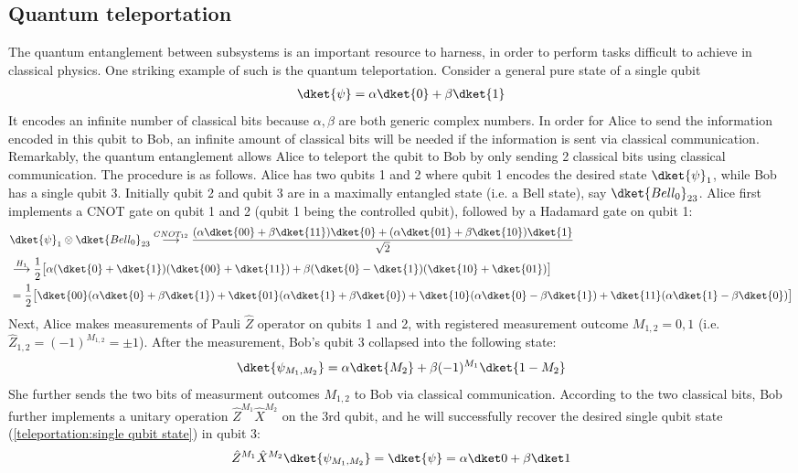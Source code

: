

\subsection{Quantum teleportation}

The quantum entanglement between subsystems is an important resource to harness, in order to perform tasks difficult to achieve in classical physics. One striking example of such is the quantum teleportation. Consider a general pure state of a single qubit
\begin{align}\label{teleportation:single qubit state}
\dket{\psi}=\alpha\dket{0}+\beta\dket{1}
\end{align}
It encodes an infinite number of classical bits because $\alpha,\beta$ are both generic complex numbers. In order for Alice to send the information encoded in this qubit to Bob, an infinite amount of classical bits will be needed if the information is sent via classical communication. Remarkably, the quantum entanglement allows Alice to teleport the qubit to Bob by only sending 2 classical bits using classical communication. The procedure is as follows. Alice has two qubits 1 and 2 where qubit 1 encodes the desired state $\dket{\psi}_1$, while Bob has a single qubit 3. Initially qubit 2 and qubit 3 are in a maximally entangled state (i.e. a Bell state), say $\dket{Bell_0}_{23}$. Alice first implements a CNOT gate on qubit 1 and 2 (qubit 1 being the controlled qubit), followed by a Hadamard gate on qubit 1:
\begin{align}
&\dket{\psi}_1\otimes\dket{Bell_0}_{23}\overset{CNOT_{12}}\longrightarrow\frac{(\alpha\dket{00}+\beta\dket{11})\dket{0}+(\alpha\dket{01}+\beta\dket{10})\dket{1}}{\sqrt2}\\
&\overset{H_1}\longrightarrow\frac12\big[\alpha(\dket{0}+\dket{1})(\dket{00}+\dket{11})+\beta(\dket{0}-\dket{1})(\dket{10}+\dket{01})\big]\\
&=\frac12\big[\dket{00}(\alpha\dket{0}+\beta\dket{1})+\dket{01}(\alpha\dket{1}+\beta\dket{0})+\dket{10}(\alpha\dket{0}-\beta\dket{1})+\dket{11}(\alpha\dket{1}-\beta\dket{0})\big]
\end{align}
Next, Alice makes measurements of Pauli $\hat Z$ operator on qubits 1 and 2, with registered measurement outcome $M_{1,2}=0,1$ (i.e. $\hat Z_{1,2}=(-1)^{M_{1,2}}=\pm1$). After the measurement, Bob's qubit 3 collapsed into the following state:
\begin{align}
\dket{\psi_{M_1,M_2}}=\alpha\dket{M_2}+\beta(-1)^{M_1}\dket{1-M_2}
\end{align}
She further sends the two bits of measurment outcomes $M_{1,2}$ to Bob via classical communication. According to the two classical bits, Bob further implements a unitary operation $\hat Z^{M_1}\hat X^{M_2}$ on the 3rd qubit, and he will successfully recover the desired single qubit state (\ref{teleportation:single qubit state}) in qubit 3:
\begin{align}
\hat Z^{M_1}\hat X^{M_2}\dket{\psi_{M_1,M_2}}=\dket{\psi}=\alpha\dket0+\beta\dket1
\end{align}
